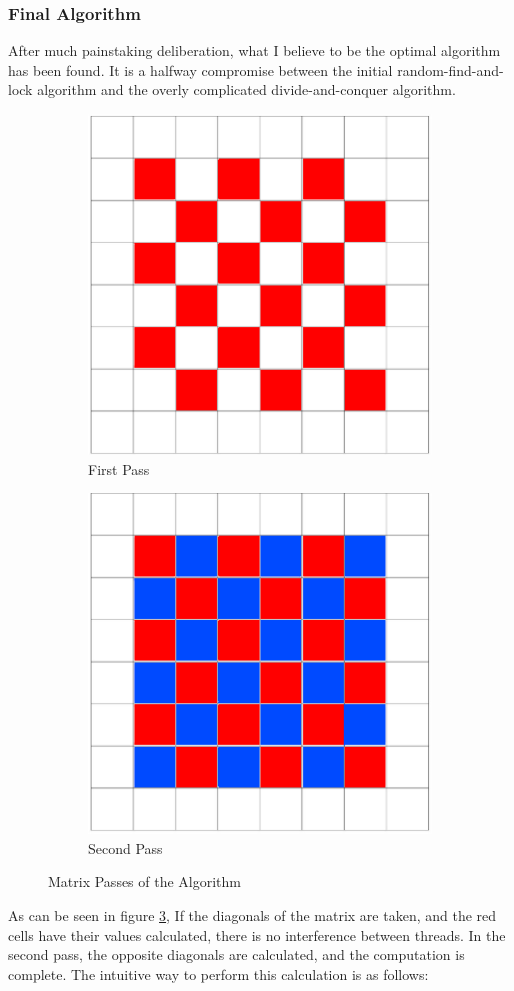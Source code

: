 \documentclass{article}
\begin{document}
\subsubsection{Final Algorithm}
After much painstaking deliberation, what I believe to be the optimal algorithm has been found. It is a halfway compromise between the initial random-find-and-lock algorithm and the overly complicated divide-and-conquer algorithm.\\\newline
\begin{figure}
    \centering
    \begin{subfigure}{.5\textwidth}
      \centering
      \includegraphics[width=.4\linewidth]{4.png}
      \caption{First Pass}
      \label{fig:sub1}
    \end{subfigure}%
    \begin{subfigure}{.5\textwidth}
      \centering
      \includegraphics[width=.4\linewidth]{5.png}
      \caption{Second Pass}
      \label{fig:sub2}
    \end{subfigure}
    \caption{Matrix Passes of the Algorithm}
    \label{fig4}
    \end{figure}
As can be seen in figure \ref{fig4}, If the diagonals of the matrix are taken, and the red cells have their values calculated, there is no interference between threads. In the second pass, the opposite diagonals are calculated, and the computation is complete. The intuitive way to perform this calculation is as follows:
\end{document}
